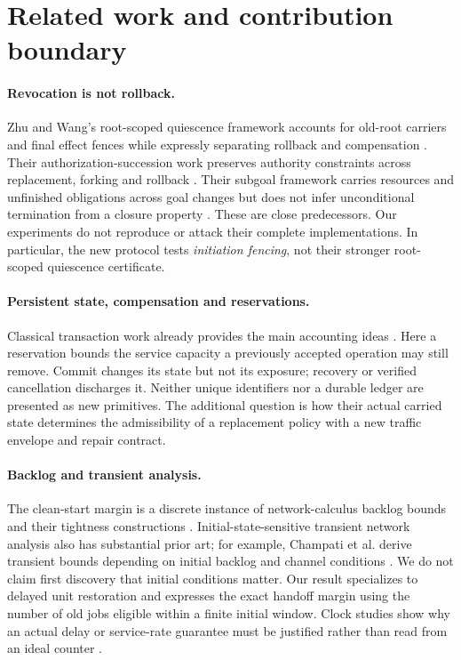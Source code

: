 \documentclass[11pt,a4paper]{article}
\theoremstyle{definition}\newtheorem{definition}{Definition}
\begin{document}
\section{Related work and contribution boundary}
\label{sec:related}
\paragraph{Revocation is not rollback.}
Zhu and Wang's root-scoped quiescence framework accounts for old-root carriers and final effect fences while expressly separating rollback and compensation \cite{quiescence}. Their authorization-succession work preserves authority constraints across replacement, forking and rollback \cite{succession}. Their subgoal framework carries resources and unfinished obligations across goal changes but does not infer unconditional termination from a closure property \cite{subgoals}. These are close predecessors. Our experiments do not reproduce or attack their complete implementations. In particular, the new protocol tests \emph{initiation fencing}, not their stronger root-scoped quiescence certificate.

\paragraph{Persistent state, compensation and reservations.}
Classical transaction work already provides the main accounting ideas \cite{sagas,escrow}. Here a reservation bounds the service capacity a previously accepted operation may still remove. Commit changes its state but not its exposure; recovery or verified cancellation discharges it. Neither unique identifiers nor a durable ledger are presented as new primitives. The additional question is how their actual carried state determines the admissibility of a replacement policy with a new traffic envelope and repair contract.

\paragraph{Backlog and transient analysis.}
The clean-start margin is a discrete instance of network-calculus backlog bounds and their tightness constructions \cite{netcal}. Initial-state-sensitive transient network analysis also has substantial prior art; for example, Champati et al. derive transient bounds depending on initial backlog and channel conditions \cite{transient}. We do not claim first discovery that initial conditions matter. Our result specializes to delayed unit restoration and expresses the exact handoff margin using the number of old jobs eligible within a finite initial window. Clock studies show why an actual delay or service-rate guarantee must be justified rather than read from an ideal counter \cite{clocks}.
\end{document}
